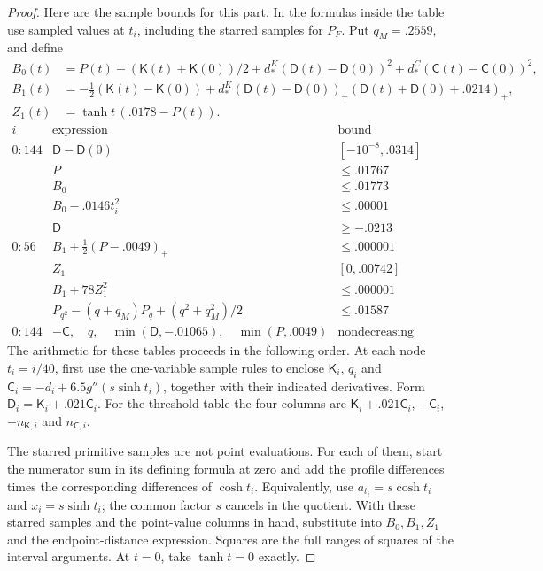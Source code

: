 \begin{proof}
Here are the sample bounds for this part. In the formulas inside the table use sampled values at $t_i$, including the starred samples for $P_F$. Put $q_M=.2559$, and define
\[
\begin{aligned}
 B_0(t)&=P(t)-(\mathsf K(t)+\mathsf K(0))/2+
       d_*^K(\mathsf D(t)-\mathsf D(0))^2+d_*^C(\mathsf C(t)-\mathsf C(0))^2,\\
 B_1(t)&=-\tfrac12(\mathsf K(t)-\mathsf K(0))
     +d_*^K(\mathsf D(t)-\mathsf D(0))_+(\mathsf D(t)+\mathsf D(0)+.0214)_+,\\
 Z_1(t)&=\tanh t\,(.0178-P(t)).
\end{aligned}
\]
\[
\begin{array}{c|l|r}
 i&\text{expression}&\text{bound}\\\hline
 0{:}144&\mathsf D-\mathsf D(0)&[-10^{-8},.0314]\\
  &P&\le .01767\\
  &B_0&\le .01773\\
  &B_0-.0146 t_i^2&\le .00001\\
  &\dot{\mathsf D}&\ge -.0213\\\hline
 0{:}56&B_1+\tfrac12(P-.0049)_+&\le .000001\\
  &Z_1 &[0,.00742]\\
  &B_1+78Z_1^2 &\le .000001\\
  &P_{q^2}-(q+q_M)P_q+(q^2+q_M^2)/2&\le .01587\\\hline
 0{:}144& -\mathsf C,\quad q,\quad \min(\mathsf D,-.01065),\quad \min(P,.0049)
      &\text{nondecreasing (samples)}
\end{array}
\]
The arithmetic for these tables proceeds in the following order. At each node $t_i=i/40$, first use the one-variable sample rules to enclose $\mathsf K_i$, $q_i$ and $\mathsf C_i=-d_i+6.5g''(s\sinh t_i)$, together with their indicated derivatives. Form $\mathsf D_i=\mathsf K_i+.021\mathsf C_i$. For the threshold table the four columns are $\dot{\mathsf K}_i+.021\dot{\mathsf C}_i$, $-\dot{\mathsf C}_i$, $-n_{\mathsf K,i}$ and $n_{\mathsf C,i}$.

The starred primitive samples are not point evaluations. For each of them, start the numerator sum in its defining formula at zero and add the profile differences times the corresponding differences of $\cosh t_i$. Equivalently, use $a_{t_i}=s\cosh t_i$ and $x_i=s\sinh t_i$; the common factor $s$ cancels in the quotient. With these starred samples and the point-value columns in hand, substitute into $B_0,B_1,Z_1$ and the endpoint-distance expression. Squares are the full ranges of squares of the interval arguments. At $t=0$, take $\tanh t=0$ exactly.


\end{proof}

